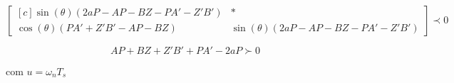 \begin{equation}
  \begin{bmatrix*}[c]
    \sin{(\theta)(2aP - AP - BZ - PA' - Z'B')} & * \\
    \cos{(\theta)(PA' + Z'B' - AP - BZ)}       & \sin{(\theta)(2aP - AP - BZ - PA' - Z'B')}
  \end{bmatrix*}
  \prec 0\label{eq:LMIESetorConicoDireito}
\end{equation}

\begin{equation}
  AP + BZ + Z'B' + PA' -2aP\label{eq:LMIRightBounded} \succ 0
\end{equation}

com $u = \omega_nT_s$